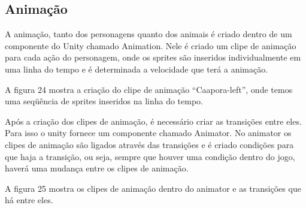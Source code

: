 \subsection{Animação}
A animação, tanto dos personagens quanto dos animais é criado dentro de um componente do Unity chamado Animation. Nele é criado um clipe de animação para cada ação do personagem, onde os sprites são inseridos individualmente em uma linha do tempo e é determinada a velocidade que terá a animação.

A figura 24 mostra a criação do clipe de animação “Caapora-left”, onde temos uma seqüência de sprites inseridos na linha do tempo.

\begin{figure}[h!]
		\centering
	\end{figure}


Após a criação dos clipes de animação, é necessário criar as transições entre eles. Para isso o unity fornece um componente chamado Animator. No animator os clipes de animação são ligados através das transições e é criado condições para que haja a transição, ou seja, sempre que houver uma condição dentro do jogo, haverá uma mudança entre os clipes de animação.
	
A figura 25 mostra os clipes de animação dentro do animator e as transições que há entre eles.

\begin{figure}[h!]
		\centering
	\end{figure}



